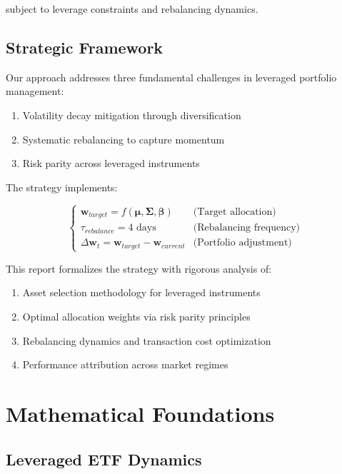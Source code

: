 \documentclass[onecolumn,ieee]{arithmaxresearch}
\begin{document}
subject to leverage constraints and rebalancing dynamics.

\subsection{Strategic Framework}
Our approach addresses three fundamental challenges in leveraged portfolio management:
\begin{enumerate}
    \item Volatility decay mitigation through diversification
    \item Systematic rebalancing to capture momentum
    \item Risk parity across leveraged instruments
\end{enumerate}

The strategy implements:


\begin{equation*}
\begin{cases}
\mathbf{w}_{target} = f(\boldsymbol{\mu}, \boldsymbol{\Sigma}, \boldsymbol{\beta}) & \text{(Target allocation)} \\
\tau_{rebalance} = 4 \text{ days} & \text{(Rebalancing frequency)} \\
\Delta \mathbf{w}_t = \mathbf{w}_{target} - \mathbf{w}_{current} & \text{(Portfolio adjustment)}
\end{cases}
\end{equation*}

This report formalizes the strategy with rigorous analysis of:
\begin{enumerate}
    \item Asset selection methodology for leveraged instruments
    \item Optimal allocation weights via risk parity principles
    \item Rebalancing dynamics and transaction cost optimization
    \item Performance attribution across market regimes
\end{enumerate}

\section{Mathematical Foundations}

\subsection{Leveraged ETF Dynamics}
\end{document}
